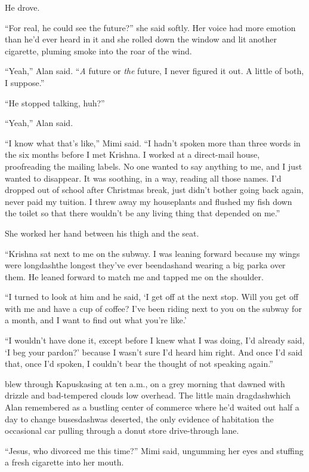 He drove.

``For real, he could see the future?'' she said softly.  Her voice had
more emotion than he'd ever heard in it and she rolled down the window
and lit another cigarette, pluming smoke into the roar of the wind.

``Yeah,'' Alan said.  ``\textit{A} future or \textit{the} future, I
never figured it out.  A little of both, I suppose.''

``He stopped talking, huh?''

``Yeah,'' Alan said.

``I know what that's like,'' Mimi said.  ``I hadn't spoken more than
three words in the six months before I met Krishna.  I worked at a
direct-mail house, proofreading the mailing labels.  No one wanted to
say anything to me, and I just wanted to disappear.  It was soothing,
in a way, reading all those names.  I'd dropped out of school after
Christmas break, just didn't bother going back again, never paid my
tuition.  I threw away my houseplants and flushed my fish down the
toilet so that there wouldn't be any living thing that depended on
me.''

She worked her hand between his thigh and the seat.

``Krishna sat next to me on the subway.  I was leaning forward because
my wings were longdash{}the longest they've ever beendash{}and wearing a big
parka over them.  He leaned forward to match me and tapped me on the
shoulder.

``I turned to look at him and he said, `I get off at the next stop. 
Will you get off with me and have a cup of coffee?  I've been riding
next to you on the subway for a month, and I want to find out what
you're like.'

``I wouldn't have done it, except before I knew what I was doing, I'd
already said, `I beg your pardon?' because I wasn't sure I'd heard him
right.  And once I'd said that, once I'd spoken, I couldn't bear the
thought of not speaking again.''

 blew through Kapuskasing at ten a.m., on a grey morning that
dawned with drizzle and bad-tempered clouds low overhead.  The little
main dragdash{}which Alan remembered as a bustling center of commerce
where he'd waited out half a day to change busesdash{}was deserted, the
only evidence of habitation the occasional car pulling through a donut
store drive-through lane.

``Jesus, who divorced me this time?'' Mimi said, ungumming her eyes
and stuffing a fresh cigarette into her mouth.


